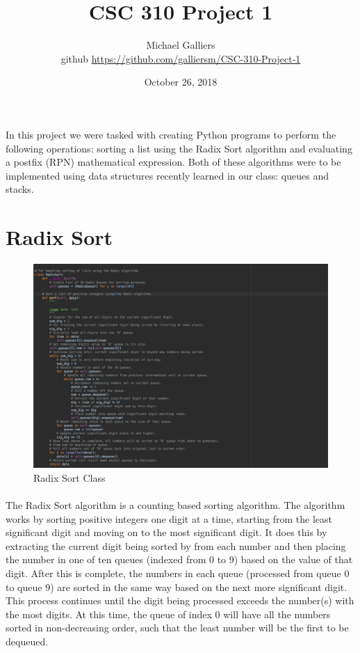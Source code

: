 \documentclass[10pt,letterpaper]{article}
\author{Michael Galliers \\ github \href{https://github.com/galliersm/CSC-310-Project-1}{https://github.com/galliersm/CSC-310-Project-1}}
\title{CSC 310 Project 1}
\date{October 26, 2018}
\begin{document}
\begin{titlepage}
\maketitle
\end{titlepage}

\paragraph{}
In this project we were tasked with creating Python programs to perform the
following operations: sorting a list using the Radix Sort algorithm and
evaluating a postfix (RPN) mathematical expression. Both of these algorithms
were to be implemented using data structures recently learned in our class:
queues and stacks.

\section{Radix Sort}

\begin{figure}[H]
\centering
\includegraphics[width=\linewidth]{radix_sort_class.png}
\caption{Radix Sort Class}
\end{figure}

\paragraph{}
The Radix Sort algorithm is a counting based sorting algorithm. The algorithm
works by sorting positive integers one digit at a time, starting from the least
significant digit and moving on to the most significant digit. It does this by
extracting the current digit being sorted by from each number and then placing
the number in one of ten queues (indexed from 0 to 9) based on the value of
that digit. After this is complete, the numbers in each queue (processed from
queue 0 to queue 9) are sorted in the same way based on the next more
significant digit. This process continues until the digit being processed
exceeds the number(s) with the most digits. At this time, the queue of index 0
will have all the numbers sorted in non-decreasing order, such that the least
number will be the first to be dequeued.
\end{document}
